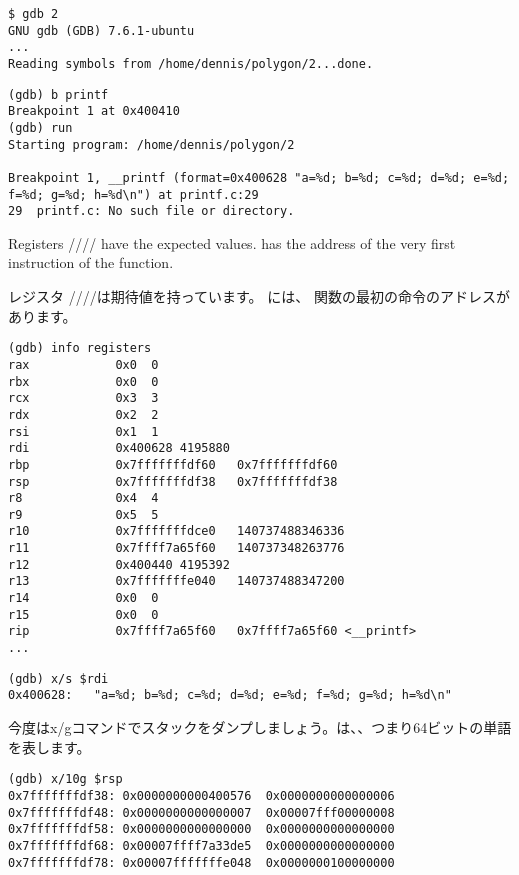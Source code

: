 \begin{lstlisting}
$ gdb 2
GNU gdb (GDB) 7.6.1-ubuntu
...
Reading symbols from /home/dennis/polygon/2...done.
\end{lstlisting}

\begin{lstlisting}[caption=ブレークポイントを \printf{} に設定して実行しましょう]
(gdb) b printf
Breakpoint 1 at 0x400410
(gdb) run
Starting program: /home/dennis/polygon/2 

Breakpoint 1, __printf (format=0x400628 "a=%d; b=%d; c=%d; d=%d; e=%d; f=%d; g=%d; h=%d\n") at printf.c:29
29	printf.c: No such file or directory.
\end{lstlisting}

Registers \RSI/\RDX/\RCX// have the expected values.
\RIP has the address of the very first instruction of the \printf function.

レジスタ \RSI/\RDX/\RCX//は期待値を持っています。
\RIP には、 \printf 関数の最初の命令のアドレスがあります。

\begin{lstlisting}
(gdb) info registers
rax            0x0	0
rbx            0x0	0
rcx            0x3	3
rdx            0x2	2
rsi            0x1	1
rdi            0x400628	4195880
rbp            0x7fffffffdf60	0x7fffffffdf60
rsp            0x7fffffffdf38	0x7fffffffdf38
r8             0x4	4
r9             0x5	5
r10            0x7fffffffdce0	140737488346336
r11            0x7ffff7a65f60	140737348263776
r12            0x400440	4195392
r13            0x7fffffffe040	140737488347200
r14            0x0	0
r15            0x0	0
rip            0x7ffff7a65f60	0x7ffff7a65f60 <__printf>
...
\end{lstlisting}

\begin{lstlisting}[caption=let's inspect the format string]
(gdb) x/s $rdi
0x400628:	"a=%d; b=%d; c=%d; d=%d; e=%d; f=%d; g=%d; h=%d\n"
\end{lstlisting}

今度はx/gコマンドでスタックをダンプしましょう。は、、つまり64ビットの単語を表します。

\begin{lstlisting}
(gdb) x/10g $rsp
0x7fffffffdf38:	0x0000000000400576	0x0000000000000006
0x7fffffffdf48:	0x0000000000000007	0x00007fff00000008
0x7fffffffdf58:	0x0000000000000000	0x0000000000000000
0x7fffffffdf68:	0x00007ffff7a33de5	0x0000000000000000
0x7fffffffdf78:	0x00007fffffffe048	0x0000000100000000
\end{lstlisting}

